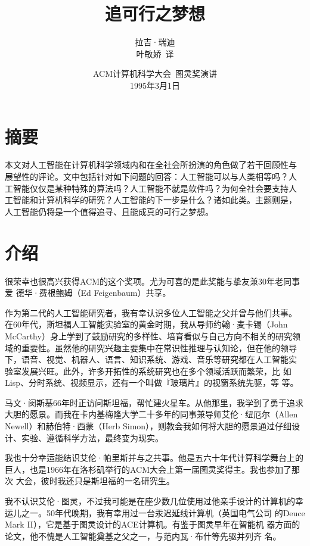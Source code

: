 \documentclass[12pt,a4paper]{article}
\begin{document}
\title{\whei 追可行之梦想}
\author{\kai 拉吉·瑞迪\\
  \kai 叶敏娇~译}
\date{\kai ACM计算机科学大会~图灵奖演讲\\
  1995年3月1日}

\maketitle

\section{摘要}
本文对人工智能在计算机科学领域内和在全社会所扮演的角色做了若干回顾性与
展望性的评论。文中包括针对如下问题的回答：人工智能可以与人类相等吗？人
工智能仅仅是某种特殊的算法吗？人工智能不就是软件吗？为何全社会要支持人
工智能和计算机科学的研究？人工智能的下一步是什么？诸如此类。主题则是，
人工智能仍将是一个值得追寻、且能成真的可行之梦想。

\section{介绍}
很荣幸也很高兴获得ACM的这个奖项。尤为可喜的是此奖能与挚友兼30年老同事爱
德华·费根鲍姆（Ed Feigenbaum）共享。

作为第二代的人工智能研究者，我有幸认识多位人工智能之父并曾与他们共事。
在60年代，斯坦福人工智能实验室的黄金时期，我从导师约翰·麦卡锡（John
McCarthy）身上学到了鼓励研究的多样性、培育看似与自己方向不相关的研究领
域的重要性。虽然他的研究兴趣主要集中在常识性推理与认知论，但在他的领导
下，语音、视觉、机器人、语言、知识系统、游戏、音乐等研究都在人工智能实
验室发展兴旺。此外，许多开拓性的系统研究也在多个领域活跃而繁荣，比
如Lisp、分时系统、视频显示，还有一个叫做『玻璃片』的视窗系统先驱，等
等。

马文·闵斯基66年时正访问斯坦福，帮忙建火星车。从他那里，我学到了勇于追求
大胆的愿景。而我在卡内基梅隆大学二十多年的同事兼导师艾伦·纽厄尔（Allen
Newell）和赫伯特·西蒙（Herb Simon），则教会我如何将大胆的愿景通过仔细设
计、实验、遵循科学方法，最终变为现实。

我也十分幸运能结识艾伦·帕里斯并与之共事。他是五六十年代计算科学舞台上的
巨人，也是1966年在洛杉矶举行的ACM大会上第一届图灵奖得主。我也参加了那次
大会，彼时我还只是斯坦福的一名研究生。

我不认识艾伦·图灵，不过我可能是在座少数几位使用过他亲手设计的计算机的幸
运儿之一。50年代晚期，我有幸用过一台汞迟延线计算机（英国电气公司
的Deuce Mark II），它是基于图灵设计的ACE计算机。有鉴于图灵早年在智能机
器方面的论文，他不愧是人工智能奠基之父之一，与范内瓦·布什等先驱并列齐
名。
\end{document}
